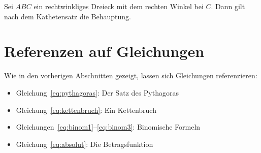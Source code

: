 \begin{beweis}
Sei $ABC$ ein rechtwinkliges Dreieck mit dem rechten Winkel bei $C$.
Dann gilt nach dem Kathetensatz die Behauptung.
\end{beweis}

\chapter{Referenzen auf Gleichungen}
\label{sec:math-referenzen}

Wie in den vorherigen Abschnitten gezeigt, lassen sich Gleichungen
referenzieren:

\begin{itemize}
    \item Gleichung~\ref{eq:pythagoras}: Der Satz des Pythagoras
    \item Gleichung~\ref{eq:kettenbruch}: Ein Kettenbruch
    \item Gleichungen~\ref{eq:binom1}--\ref{eq:binom3}: Binomische Formeln
    \item Gleichung~\ref{eq:absolut}: Die Betragsfunktion
\end{itemize}